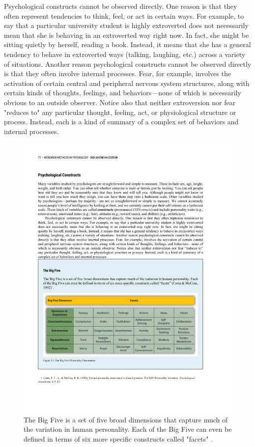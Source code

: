 Psychological constructs cannot be observed directly. One reason is that they often represent tendencies to think, feel, or act in certain ways. For example, to say that a particular university student is highly extroverted does not necessarily mean that she is behaving in an extroverted way right now. In fact, she might be sitting quietly by herself, reading a book. Instead, it means that she has a general tendency to behave in extroverted ways (talking, laughing, etc.) across a variety of situations. Another reason psychological constructs cannot be observed directly is that they often involve internal processes. Fear, for example, involves the activation of certain central and peripheral nervous system structures, along with certain kinds of thoughts, feelings, and behaviors—none of which is necessarily obvious to an outside observer. Notice also that neither extroversion nor fear "reduces to" any particular thought, feeling, act, or physiological structure or process. Instead, each is a kind of summary of a complex set of behaviors and internal processes.


\begin{figure}
      \includegraphics[width=\linewidth]{figures/C5bigfive.pdf}
      \caption{The Big Five is a set of five broad dimensions that capture much of the variation in human personality. Each of the Big Five can even be defined in terms of six more specific constructs called "facets" \citep{costa_normal_1992}.
}
      \label{fig:bigfive}
\end{figure}


